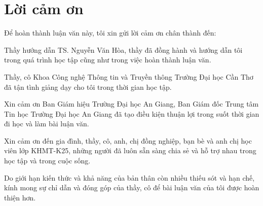 \chapter*{Lời cảm ơn}
Để hoàn thành luận văn này, tôi xin gửi lời cảm ơn chân thành đến:

Thầy hướng dẫn TS. Nguyễn Văn Hòa, thầy đã đồng hành và hướng dẫn tôi trong quá trình học tập cũng như trong việc hoàn thành luận văn.

Thầy, cô Khoa Công nghệ Thông tin và Truyền thông Trường Đại học Cần Thơ đã tận tình giảng dạy cho tôi trong thời gian học tập.

Xin cảm ơn Ban Giám hiệu Trường Đại học An Giang, Ban Giám đốc Trung tâm Tin học Trường Đại học An Giang đã tạo điều kiện thuận lợi trong suốt thời gian đi học và làm bài luận văn.

Xin cảm ơn đến gia đình, thầy, cô, anh, chị đồng nghiệp, bạn bè và anh chị học viên lớp KHMT-K25, những người đã luôn sẵn sàng chia sẻ và hỗ trợ nhau trong học tập và trong cuộc sống.

Do giới hạn kiến thức và khả năng của bản thân còn nhiều thiếu sót và hạn chế, kính mong sự chỉ dẫn và đóng góp của thầy, cô để bài luận văn của tôi được hoàn thiện hơn.